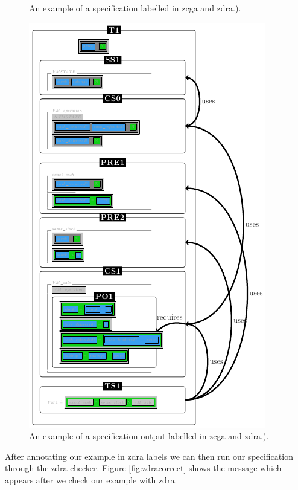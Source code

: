 \begin{figure}[H]
\begin{minipage}{0.45\textwidth}
\begin{tiny}
\begin{BVerbatim}[commandchars=+\[\]]
\end{BVerbatim}
\end{tiny}
\vspace{-0.18in}
\caption{An example of a specification labelled in \gls{zcga} and \gls{zdra}.).\label{fig:zdrazcgaAno}}
\vspace{-0.2in}
\end{minipage}\hfill
\begin{minipage}{0.45\textwidth}
\centering
\includegraphics[scale=0.55]{Figures/fullexample/zdra.png}
\vspace{-0.18in}
\caption{An example of a specification output labelled in \gls{zcga} and \gls{zdra}.).\label{fig:zdrazcgaout}}
\vspace{-0.2in}
\end{minipage}
\end{figure}

After annotating our example in \gls{zdra} labels we can then run our specification through the \gls{zdra} checker. Figure \ref{fig:zdracorrect} shows the message which appears after we check our example with \gls{zdra}.


